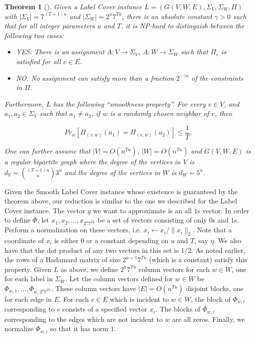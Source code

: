 \documentclass[11pt]{article}
\newtheorem{thm}{Theorem}[section]
\begin{document}
\begin{thm} [\cite{SmoothLC}]
\label{smooth}
Given a Label Cover instance
$L = (G(V,W,E),\Sigma_V, \Sigma_W,\Pi)$ with
$|\Sigma_V| = 7^{(T+1)u}$ and $|\Sigma_W|= 2^u 7^{Tu}$,
there is an absolute constant $\gamma > 0$ such that for
all integer parameters $u$ and $T$, it is \textsf{NP}-hard to distinguish
between the following two cases:

\begin{itemize}
\item YES. There is an assignment $A\colon V \rightarrow
\Sigma_V$, $A\colon W \rightarrow \Sigma_W$ such that $\Pi_e$ is
satisfied for all $e \in E$.

\item NO. No assignment can satisfy more than a fraction
$2^{-\gamma u}$ of the constraints in $\Pi$.
\end{itemize}

\noindent Furthermore, $L$ has the following ``smoothness
property''. For every $v \in V$, and $a_1,a_2 \in \Sigma_V$
such that $a_1 \neq a_2$, if $w$ is a randomly chosen
neighbor of $v$, then

$$
Pr_w \left[ \Pi_{(v,w)}(a_1) = \Pi_{(v,w)}(a_2) \right] \leq \frac{1}{T}.
$$

\noindent One can further assume that $|V| = O(n^{Tu})$, $|W| = O(n^{Tu})$
and $G(V,W,E)$ is a regular bipartite graph where the
degree of the vertices in $V$ is $d_V = {(T+1)u \choose u} 3^u$
and the degree of the vertices in $W$ is $d_W = 5^u$.
\end{thm}

Given the Smooth Label Cover instance whose existence is
guaranteed by the theorem above, our reduction is similar
to the one we described for the Label Cover instance. The
vector $y$ we want to approximate is an all $1$s vector.
In order to define $\Phi$, let $x_1, x_2, \hdots, x_{2^u 7^{Tu}}$
be a set of vectors consisting of only  $0$s and $1$s.
Perform a normalization on these vectors, i.e.
$x_i \leftarrow x_i/\|x_i\|_2$. Note that a coordinate of
$x_i$ is either $0$ or a constant depending on $u$ and $T$,
say $\eta$. We also have that the dot product of any two
vectors in this set is $1/2$. As noted earlier, the rows
of a Hadamard matrix of size $2^{u+1} 7^{Tu}$ (which is
a constant) satisfy this property. Given $L$ as above, we
define $2^u 7^{Tu}$ column vectors for each $w \in W$, one
for each label in $\Sigma_W$. Let the column vectors
defined for $w \in W$ be $\Phi_{w,1}, \hdots, \Phi_{w,2^u 7^{Tu}}$.
These column vectors have $|E| = O(n^{Tu})$ disjoint blocks,
one for each edge in $E$. For each $e \in E$ which is
incident to $w \in W$, the block of $\Phi_{w,i}$
corresponding to $e$ consists of a specified vector $x_i$.
The blocks of $\Phi_{w,i}$ corresponding to
the edges which are not incident to $w$ are all zeros.
Finally, we normalize $\Phi_{w,i}$ so that it has norm $1$.
\end{document}
